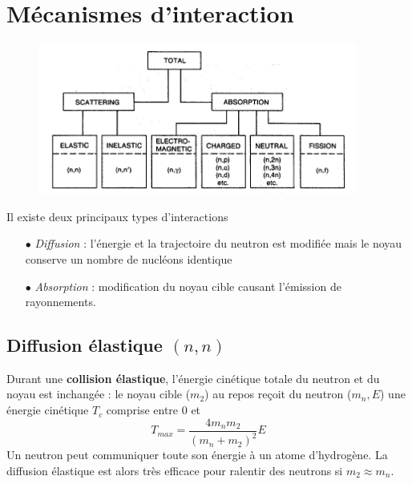 \newpage
\section{Mécanismes d'interaction}%
	\begin{figure}
	\vspace{-15mm}
	\includegraphics[scale=0.7]{ch5/image1}
	\end{figure}
Il existe deux principaux types d'interactions
\begin{enumerate}
\item[$\bullet$] \textit{Diffusion} : l'énergie et la trajectoire du neutron est modifiée mais le 
noyau conserve un nombre de nucléons identique
\item[$\bullet$] \textit{Absorption} : modification du noyau cible causant l'émission de rayonnements.
\end{enumerate}

\subsection{Diffusion élastique $(n,n)$}%
Durant une \textbf{collision élastique}, l'énergie cinétique totale du neutron et du noyau est 
inchangée : le noyau cible ($m_2$) au repos reçoit du neutron ($m_n,E$) une énergie cinétique
$T_c$ comprise entre 0 et 
\begin{equation}
T_{max}=\frac{4m_nm_2}{(m_n+m_2)^2}E
\end{equation}
Un neutron peut communiquer toute son énergie à un atome d'hydrogène. La diffusion élastique est
alors très efficace pour ralentir des neutrons si $m_2\approx m_n$.\\

